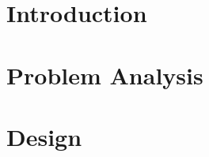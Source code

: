 %
%
%
%
% 





%
%
\chapter{Introduction}\label{ch:introduction}
    
    
    

    
    
%
%
\chapter{Problem Analysis}\label{ch:PA}
    
    
    
    
    
    

%
%

    

%
%
\chapter{Design}\label{ch:design}
    
